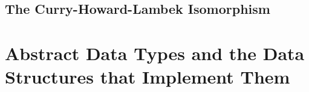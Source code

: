 

\subsection{The Curry-Howard-Lambek Isomorphism}







\toclineskip
\section{Abstract Data Types and the Data Structures that Implement Them}





